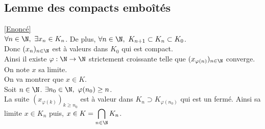 \documentclass{book}
\begin{document}
	\subsection{Lemme des compacts emboîtés }
	\label{sec:lemme-des-compacts-emboites-etoile1}
	\textcolor{blue}{\hyperref[Lemme des compacts emboités]{[Enoncé]}}\\
	\label{Lemme des compacts emboîtés corrigé}
	$\forall n\in \N,\ \exists x_n\in K_n$. De plus, $\forall n\in \N,\ K_{n+1}\subset K_n\subset K_0$.\\
	Donc $(x_n)_{n\in \N}$ est à valeurs dans $K_0$ qui est compact.\\
	Ainsi il existe $\varphi:\N\to\N$ strictement croissante telle que $(x_{\varphi(n)})_{n\in \N}$ converge. On note $x$ sa limite.\\
	On va montrer que $x\in K$.\\
	Soit $n\in \N$. $\exists n_0\in \N,\ \varphi(n_0)\geq n$.\\
	La suite $(x_{\varphi(k)})_{k\geq n_0}$ est à valeur dans  $K_n\supset K_{\varphi(n_0)}$ qui est un fermé. Ainsi sa limite $x\in K_{n}$ puis, $x\in K=\displaystyle\bigcap\limits_{n\in \N} K_n$.\\
	
\end{document}
